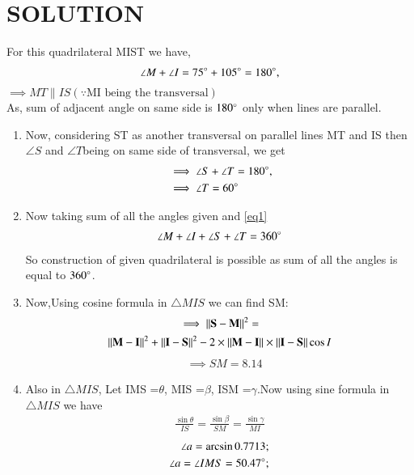 \documentclass[journal,12pt,twocolumn]{IEEEtran}
\begin{document}
\section{SOLUTION}
For this quadrilateral MIST we have,
\begin{align}
\angle M +\angle I = 75\degree + 105\degree =180\degree,
\end{align}
$ \implies MT \parallel IS (\because \text {MI being the transversal})$
\\
As, sum of adjacent angle on same side is $180\degree$ only when lines are parallel.
\begin{enumerate}
    \item Now, considering ST as another transversal on parallel lines MT and IS then$\angle S$ and $\angle T $being on same side of transversal, we get
\begin{align}
&\implies \angle S + \angle T = 180\degree,
\\
&\implies \angle T = 60\degree\label{eq1}
\end{align}
 \item Now taking sum of all the angles given and \eqref{eq1}  
\begin{align}
\angle M + \angle I +\angle S +\angle T =360\degree
\end{align}
So construction of given quadrilateral is possible as sum of all the angles is equal to $360\degree$.
\\
 \item Now,Using cosine formula in $\triangle MIS$ we can find SM:
\begin{multline}
\implies {\Vert\mathbf{S}-\mathbf{M}\rVert^2}=
\\
{\Vert\mathbf{M}-\mathbf{I}\rVert^2}+ \Vert\mathbf{I}-\mathbf{S}\rVert^2-2\times\Vert\mathbf{M}-\mathbf{I}\rVert \times \Vert\mathbf{I}-\mathbf{S}\rVert\cos{I}
\end{multline}
\begin{align}
&\implies SM=8.14
\end{align}
\item Also in $\triangle MIS$, Let \angle IMS =$\theta$, \angle MIS =$\beta$, \angle ISM =$\gamma$.Now using sine formula in $\triangle MIS$ we have
\begin{align}
\frac{{\sin \theta}}{IS} = \frac{{\sin \beta}}{SM} = \frac{{\sin \gamma}}{MI}
\end{align}
\begin{align}
\angle a=\arcsin 0.7713;
\\
\angle a=\angle IMS= 50.47 \degree ;
\end{align}

\end{enumerate}
\end{document}

